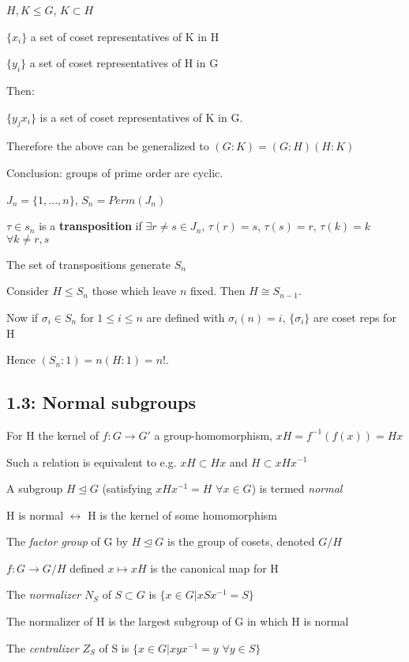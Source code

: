 \documentclass[12pt]{article}
\begin{document}
$H, K \leq G$, $K \subset H$

$\{x_i\}$ a set of coset representatives of K in H

$\{y_i\}$ a set of coset representatives of H in G

\noindent
Then:

$\{y_jx_i\}$ is a set of coset representatives of K in G.

\noindent
Therefore the above can be generalized to $(G : K) = (G : H)(H : K)$

\noindent
Conclusion: groups of prime order are cyclic.

\noindent
$J_n = \{1, ... , n\}$, $S_n = Perm(J_n)$

$\tau \in s_n$ is a \textbf{transposition} if $\exists r \neq s \in J_n$, $\tau(r) = s$, $\tau(s) = r$, $\tau(k) = k$ $\forall k \neq r, s$

The set of transpositions generate $S_n$

Consider $H \leq S_n$ those which leave $n$ fixed. Then $H \cong S_{n-1}$.

Now if $\sigma_i \in S_n$ for $1 \leq i \leq n$ are defined with $\sigma_i(n) = i$, $\{\sigma_i\}$ are coset reps for H

Hence $(S_n : 1) = n(H : 1) = n!$. 

\subsection{1.3: Normal subgroups}

\noindent
For H the kernel of $f: G \to G'$ a group-homomorphism, $xH = f^{-1}(f(x)) = Hx$

Such a relation is equivalent to e.g. $xH \subset Hx$ and $H \subset xHx^{-1}$

A subgroup $H \trianglelefteq G$ (satisfying $xHx^{-1} = H$ $\forall x \in G$) is termed \textit{normal}

H is normal $\leftrightarrow$ H is the kernel of some homomorphism

\noindent
The \textit{factor group} of G by $H \trianglelefteq G$ is the group of cosets, denoted $G\slash H$

$f: G \to G\slash H$ defined $x \mapsto xH$ is the canonical map for H

\noindent
The \textit{normalizer} $N_S$ of $S \subset G$ is $\{x \in G | xSx^{-1} = S \}$

The normalizer of H is the largest subgroup of G in which H is normal

\noindent
The \textit{centralizer} $Z_S$ of S is $\{x \in G|xyx^{-1} = y$ $\forall y \in S\}$
\end{document}

